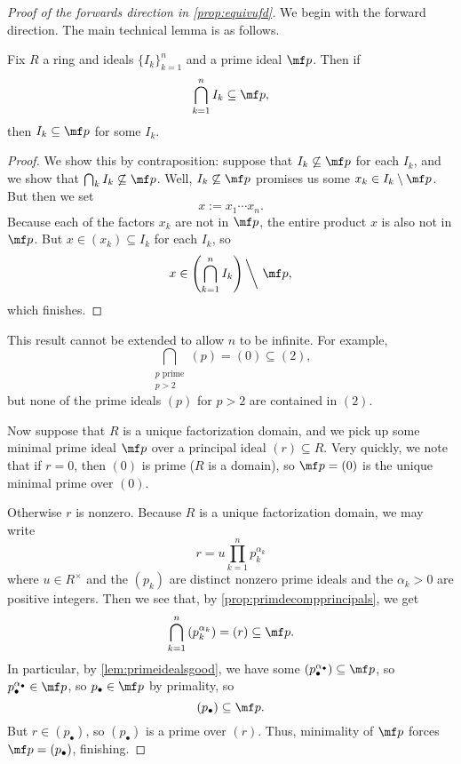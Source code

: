 \begin{proof}[Proof of the forwards direction in \autoref{prop:equivufd}]
	We begin with the forward direction. The main technical lemma is as follows.
	\begin{lemma} \label{lem:primeidealsgood}
		Fix $R$ a ring and ideals $\{I_k\}_{k=1}^n$ and a prime ideal $\mf p$. Then if
		\[\bigcap_{k=1}^nI_k\subseteq\mf p,\]
		then $I_k\subseteq\mf p$ for some $I_k$.
	\end{lemma}
	\begin{proof}
		We show this by contraposition: suppose that $I_k\not\subseteq\mf p$ for each $I_k$, and we show that $\bigcap_kI_k\not\subseteq\mf p$. Well, $I_k\not\subseteq\mf p$ promises us some $x_k\in I_k\setminus\mf p$. But then we set
		\[x:=x_1\cdots x_n.\]
		Because each of the factors $x_k$ are not in $\mf p$, the entire product $x$ is also not in $\mf p$. But $x\in(x_k)\subseteq I_k$ for each $I_k$, so
		\[x\in\left(\bigcap_{k=1}^nI_k\right){\mathbin\bigg\backslash}~\mf p,\]
		which finishes.
	\end{proof}
	\begin{remark}[Nir]
		This result cannot be extended to allow $n$ to be infinite. For example,
		\[\bigcap_{\substack{p\text{ prime}\\p>2}}(p)=(0)\subseteq(2),\]
		but none of the prime ideals $(p)$ for $p>2$ are contained in $(2)$.
	\end{remark}
	Now suppose that $R$ is a unique factorization domain, and we pick up some minimal prime ideal $\mf p$ over a principal ideal $(r)\subseteq R$. Very quickly, we note that if $r=0$, then $(0)$ is prime ($R$ is a domain), so $\mf p=(0)$ is the unique minimal prime over $(0)$.
	
	Otherwise $r$ is nonzero. Because $R$ is a unique factorization domain, we may write
	\[r=u\prod_{k=1}^np_k^{\alpha_k}\]
	where $u\in R^\times$ and the $(p_k)$ are distinct nonzero prime ideals and the $\alpha_k>0$ are positive integers. Then we see that, by \autoref{prop:primdecompprincipals}, we get
	\[\bigcap_{k=1}^n\left(p_k^{\alpha_k}\right)=(r)\subseteq\mf p.\]
	In particular, by \autoref{lem:primeidealsgood}, we have some $\left(p_\bullet^{\alpha_\bullet}\right)\subseteq\mf p$, so $p_\bullet^{\alpha_\bullet}\in\mf p$, so $p_\bullet\in\mf p$ by primality, so
	\[(p_\bullet)\subseteq\mf p.\]
	But $r\in(p_\bullet)$, so $(p_\bullet)$ is a prime over $(r)$. Thus, minimality of $\mf p$ forces $\mf p=(p_\bullet)$, finishing.
\end{proof}
